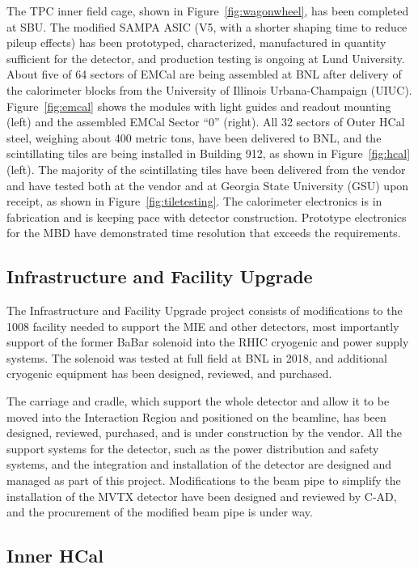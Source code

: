 The TPC inner field cage, shown in Figure~\ref{fig:wagonwheel}, has
been completed at SBU. The modified SAMPA ASIC (V5, with a shorter
shaping time to reduce pileup effects) has been prototyped,
characterized, manufactured in quantity sufficient for the detector,
and production testing is ongoing at Lund University.  About five of
64 sectors of EMCal are being assembled at BNL after delivery of the
calorimeter blocks from the University of Illinois Urbana-Champaign
(UIUC).  Figure~\ref{fig:emcal} shows the modules with light guides
and readout mounting (left) and the assembled EMCal Sector ``0''
(right).  All 32 sectors of Outer HCal steel, weighing about 400
metric tons, have been delivered to BNL, and the scintillating tiles
are being installed in Building 912, as shown in Figure~\ref{fig:hcal}
(left).  The majority of the scintillating tiles have been delivered
from the vendor and have tested both at the vendor and at Georgia
State University (GSU) upon receipt, as shown in
Figure~\ref{fig:tiletesting}.  The calorimeter electronics is in
fabrication and is keeping pace with detector construction.  Prototype
electronics for the MBD have demonstrated time resolution that exceeds
the requirements.

\subsection{Infrastructure and Facility Upgrade}

The Infrastructure and Facility Upgrade project consists of
modifications to the 1008 facility needed to support the MIE and other
detectors, most importantly support of the former BaBar solenoid into
the RHIC cryogenic and power supply systems.  The solenoid was tested
at full field at BNL in 2018, and additional cryogenic equipment has
been designed, reviewed, and purchased.

The carriage and cradle, which support the whole detector and allow it
to be moved into the Interaction Region and positioned on the
beamline, has been designed, reviewed, purchased, and is under
construction by the vendor.  All the support systems for the detector,
such as the power distribution and safety systems, and the integration
and installation of the detector are designed and managed as part of
this project.  Modifications to the beam pipe to simplify the
installation of the MVTX detector have been designed and reviewed by
C-AD, and the procurement of the modified beam pipe is under way.

\subsection{Inner HCal}

